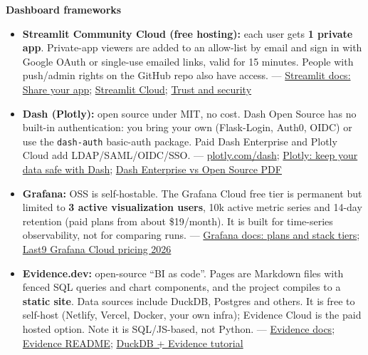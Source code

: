 \documentclass{article}
\begin{document}
\textbf{Dashboard frameworks}

\begin{itemize}

\item \textbf{Streamlit Community Cloud (free hosting):} each user gets \textbf{1 private app}. Private-app viewers are added to an allow-list by email and sign in with Google OAuth or single-use emailed links, valid for 15 minutes. People with push/\allowbreak{}admin rights on the GitHub repo also have access. --- \href{https://docs.streamlit.io/deploy/streamlit-community-cloud/share-your-app}{Streamlit docs: Share your app}; \href{https://streamlit.io/cloud}{Streamlit Cloud}; \href{https://docs.streamlit.io/deploy/streamlit-community-cloud/get-started/trust-and-security}{Trust and security}

\item \textbf{Dash (Plotly):} open source under MIT, no cost. Dash Open Source has no built-in authentication: you bring your own (Flask-Login, Auth0, OIDC) or use the \texttt{dash-\allowbreak{}auth} basic-auth package. Paid Dash Enterprise and Plotly Cloud add LDAP/\allowbreak{}SAML/\allowbreak{}OIDC/\allowbreak{}SSO. --- \href{https://plotly.com/dash/}{plotly.com/\allowbreak{}dash}; \href{https://plotly.com/blog/how-to-keep-your-data-safe-with-dash/}{Plotly: keep your data safe with Dash}; \href{https://info.plotly.com/rs/030-IKF-260/images/Dash_Enterprise_vs_Dash_Open_Source___Full_Stack_Development___2025.pdf}{Dash Enterprise vs Open Source PDF}

\item \textbf{Grafana:} OSS is self-hostable. The Grafana Cloud free tier is permanent but limited to \textbf{3 active visualization users}, 10k active metric series and 14-day retention (paid plans from about \$19/\allowbreak{}month). It is built for time-series observability, not for comparing runs. --- \href{https://grafana.com/docs/grafana-cloud/platform/pricing-and-usage/stack-plans/}{Grafana docs: plans and stack tiers}; \href{https://last9.io/blog/grafana-cloud-pricing/}{Last9 Grafana Cloud pricing 2026}

\item \textbf{Evidence.dev:} open-source ``BI as code''. Pages are Markdown files with fenced SQL queries and chart components, and the project compiles to a \textbf{static site}. Data sources include DuckDB, Postgres and others. It is free to self-host (Netlify, Vercel, Docker, your own infra); Evidence Cloud is the paid hosted option. Note it is SQL/\allowbreak{}JS-based, not Python. --- \href{https://docs.evidence.dev/}{Evidence docs}; \href{https://github.com/evidence-dev/evidence/blob/next/README.md}{Evidence README}; \href{https://duckdblab.org/en/post/duckdb-evidence-bi-dashboard/}{DuckDB + Evidence tutorial}

\end{itemize}
\end{document}
